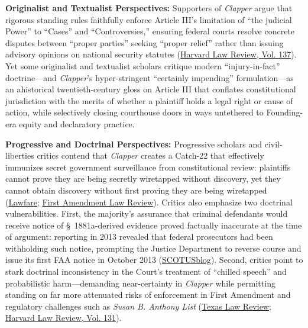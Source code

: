 \documentclass[12pt]{article}
\begin{document}
\textbf{Originalist and Textualist Perspectives:} Supporters of \textit{Clapper} argue that rigorous standing rules faithfully enforce Article III's limitation of ``the judicial Power'' to ``Cases'' and ``Controversies,'' ensuring federal courts resolve concrete disputes between ``proper parties'' seeking ``proper relief'' rather than issuing advisory opinions on national security statutes (\href{https://harvardlawreview.org/print/vol-137/proper-parties-proper-relief/}{Harvard Law Review, Vol. 137}). Yet some originalist and textualist scholars critique modern ``injury-in-fact'' doctrine---and \textit{Clapper}'s hyper-stringent ``certainly impending'' formulation---as an ahistorical twentieth-century gloss on Article III that conflates constitutional jurisdiction with the merits of whether a plaintiff holds a legal right or cause of action, while selectively closing courthouse doors in ways untethered to Founding-era equity and declaratory practice.

\textbf{Progressive and Doctrinal Perspectives:} Progressive scholars and civil-liberties critics contend that \textit{Clapper} creates a Catch-22 that effectively immunizes secret government surveillance from constitutional review: plaintiffs cannot prove they are being secretly wiretapped without discovery, yet they cannot obtain discovery without first proving they are being wiretapped (\href{https://www.lawfaremedia.org/article/why-clapper-matters-future-programmatic-surveillance}{Lawfare}; \href{https://journals.law.unc.edu/firstamendmentlawreview/wp-content/uploads/sites/8/2023/08/dickinson-piece-1.pdf}{First Amendment Law Review}). Critics also emphasize two doctrinal vulnerabilities. First, the majority's assurance that criminal defendants would receive notice of \S~1881a-derived evidence proved factually inaccurate at the time of argument: reporting in 2013 revealed that federal prosecutors had been withholding such notice, prompting the Justice Department to reverse course and issue its first FAA notice in October 2013 (\href{https://www.scotusblog.com/2013/07/wednesday-round-up-192/}{SCOTUSblog}). Second, critics point to stark doctrinal inconsistency in the Court's treatment of ``chilled speech'' and probabilistic harm---demanding near-certainty in \textit{Clapper} while permitting standing on far more attenuated risks of enforcement in First Amendment and regulatory challenges such as \textit{Susan B. Anthony List} (\href{https://texaslawreview.org/chill/}{Texas Law Review}; \href{https://harvardlawreview.org/print/vol-131/standing-surveillance-and-technology-companies/}{Harvard Law Review, Vol. 131}).
\end{document}
